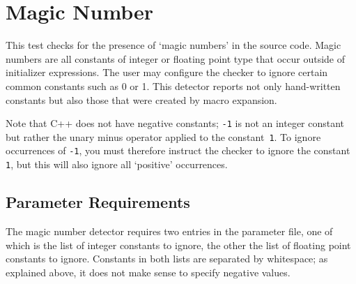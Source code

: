 %
%

\section{Magic Number}
\label{MagicNumber::overview}

This test checks for the presence of `magic numbers' in the source code. Magic
numbers are all constants of integer or floating point type that occur outside
of initializer expressions. The user may configure the checker to ignore
certain common constants such as 0 or 1. This detector reports not only
hand-written constants but also those that were created by macro expansion.
 
Note that C++ does not have negative constants; \verb|-1| is not an integer
constant but rather the unary minus operator applied to the constant~\verb|1|.
To ignore occurrences of \verb|-1|, you must therefore instruct the checker to
ignore the constant \verb|1|, but this will also ignore all `positive'
occurrences.

\subsection{Parameter Requirements}

The magic number detector requires two entries in the parameter file, one of
which is the list of integer constants to ignore, the other the list of
floating point constants to ignore. Constants in both lists are separated by
whitespace; as explained above, it does not make sense to specify negative
values.
 
